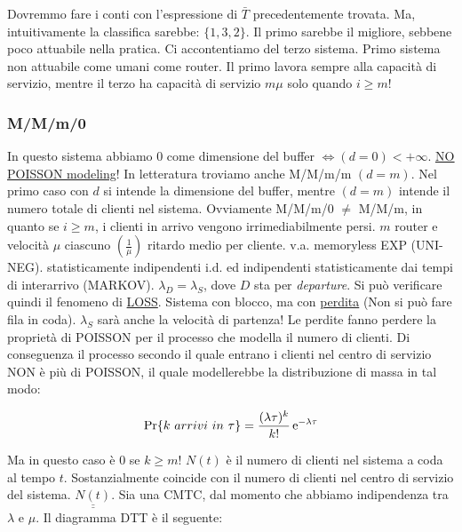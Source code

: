 Dovremmo fare i conti con l'espressione di $\bar{T}$ precedentemente trovata. Ma, intuitivamente la classifica sarebbe: $\{1,3,2\}$. Il primo sarebbe il migliore, sebbene poco attuabile nella pratica. Ci accontentiamo del terzo sistema. Primo sistema non attuabile come umani come router. Il primo lavora sempre alla capacità di servizio, mentre il terzo ha capacità di servizio $m\mu$ solo quando $i\geq m$!

\subsubsection{M/M/m/0}

In questo sistema abbiamo 0 come dimensione del buffer \newline
$\iff (d=0)<+\infty$. \underline{\underline{NO POISSON modeling}}!
In letteratura troviamo anche M/M/m/m $(d=m)$. Nel primo caso con $d$ si intende la dimensione del buffer, mentre $(d=m)$ intende il numero totale di clienti nel sistema. Ovviamente M/M/m/0 $\neq$ M/M/m, in quanto se $i\geq m$, i clienti in arrivo vengono irrimediabilmente persi. $m$ router e velocità $\mu$ ciascuno $(\frac{1}{\mu})$ ritardo medio per cliente. v.a. memoryless EXP (UNI-NEG). statisticamente indipendenti i.d. ed indipendenti statisticamente dai tempi di interarrivo (MARKOV). $\lambda_D=\lambda_S$, dove $D$ sta per \textit{departure}. Si può verificare quindi il fenomeno di \underline{LOSS}. Sistema con blocco, ma con \underline{perdita} (Non si può fare fila in coda). $\lambda_S$ sarà anche la velocità di partenza! Le perdite fanno perdere la proprietà di POISSON per il processo che modella il numero di clienti. Di conseguenza il processo secondo il quale entrano i clienti nel centro di servizio NON è più di POISSON, il quale modellerebbe la distribuzione di massa in tal modo:

\[	
	\Pr\{k\ arrivi\ in\ \tau\} = \frac{(\lambda\tau)^k}{k!}\mathop{}\!\mathrm{e}^{-\lambda\tau}
\]

Ma in questo caso è 0 se $k\geq m$! $N(t)$ è il numero di clienti nel sistema a coda al tempo $t$. Sostanzialmente coincide con il numero di clienti nel centro di servizio del sistema. $\underline{\underline{N(t)}}$. Sia una CMTC, dal momento che abbiamo indipendenza tra $\lambda$ e $\mu$. Il diagramma DTT è il seguente:

